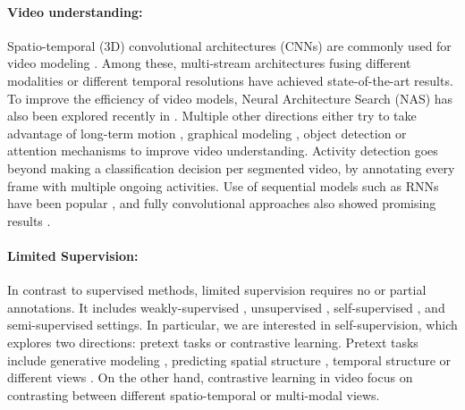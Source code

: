 \documentclass[10pt,twocolumn,letterpaper]{article}
\begin{document}
\paragraph{Video understanding:} Spatio-temporal (3D) convolutional architectures (CNNs) are commonly used for video modeling \cite{tran2014c3d,carreira2017quo, tran2017convnet}. Among these, multi-stream architectures fusing different modalities \cite{simonyan2014two, feichtenhofer2016convolutional} or different temporal resolutions \cite{feichtenhofer2019slowfast, kahatapitiya2021coarse} have achieved state-of-the-art results. To improve the efficiency of video models, Neural Architecture Search (NAS) has also been explored recently in \cite{ryoo2019assemblenet, feichtenhofer2020x3d}. Multiple other directions either try to take advantage of long-term motion \cite{yue2015beyond, varol2017long, piergiovanni2018learning, piergiovanni2019temporal, kahatapitiya2021coarse, dai2021pdan}, graphical modeling \cite{zhao2021video, ghosh2020stacked, mavroudi2020representation, ji2020action}, object detection \cite{ma2018attend, baradel2018object, zhou2019grounded} or attention mechanisms \cite{nawhal2021activity, tan2021relaxed, chang2021augmented} to improve video understanding. Activity detection goes beyond making a classification decision per segmented video, by annotating every frame with multiple ongoing activities. Use of sequential models such as RNNs have been popular \cite{escorcia2016daps, buch2017sst, yuan2016temporal, yeung2016end, yeung2018every}, and fully convolutional approaches also showed promising results \cite{shou2016temporal, zhao2017temporal, xu2017r, shou2017cdc}.


\paragraph{Limited Supervision:} In contrast to supervised methods, limited supervision requires no or partial annotations. It includes weakly-supervised \cite{sun2015temporal,richard2017weakly,kuehne2017weakly,nguyen2019weakly,liu2019weakly,shi2020weakly,nguyen2018weakly,liu2019completeness}, unsupervised \cite{sener2018unsupervised,kukleva2019unsupervised,gong2020learning}, self-supervised \cite{jain2020actionbytes,chen2020action}, and semi-supervised \cite{ji2019learning} settings. In particular, we are interested in self-supervision, which explores two directions: pretext tasks or contrastive learning. Pretext tasks include generative modeling \cite{zhang2016colorful, pathak2016context, chu2020learning}, predicting spatial structure \cite{ahsan2019video, kim2018learning, doersch2015unsupervised, jing2018self,gidaris2018unsupervised}, temporal structure \cite{misra2016shuffle, wei2018learning, xu2019self, purushwalkam2020aligning, zhukov2020learning} or different views \cite{recasens2021broaden, grill2020bootstrap}. On the other hand, contrastive learning \cite{chen2021exploring, he2020momentum, chen2020simple} in video focus on contrasting between different spatio-temporal \cite{qian2021spatiotemporal, jabri2020space, bai2020can} or multi-modal \cite{kong2020cycle, han2020self} views.
\end{document}

